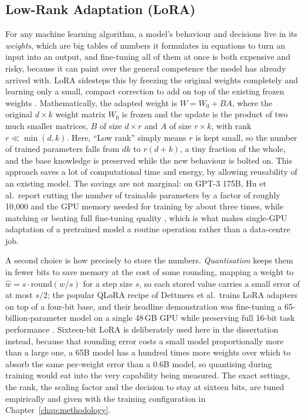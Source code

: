 \subsection{Low-Rank Adaptation (LoRA)}
\label{subsec:low-rank-adaptation-lora}

For any machine learning algorithm, a model's behaviour and decisions live in its \emph{weights}, which are big tables of numbers it formulates in equations to turn an input into an output, and fine-tuning all of them at once is both expensive and risky, because it can paint over the general competence the model has already arrived with. LoRA sidesteps this by freezing the original weights completely and learning only a small, compact correction to add on top of the existing frozen weights \cite{hu2021loralowrankadaptationlarge}. Mathematically, the adapted weight is $W = W_0 + BA$, where the original $d \times k$ weight matrix $W_0$ is frozen and the update is the product of two much smaller matrices, $B$ of size $d \times r$ and $A$ of size $r \times k$, with rank $r \ll \min(d,k)$. Here, ``Low rank'' simply means $r$ is kept small, so the number of trained parameters falls from $dk$ to $r(d+k)$, a tiny fraction of the whole, and the base knowledge is preserved while the new behaviour is bolted on. This approach saves a lot of computational time and energy, by allowing reusability of an existing model. The savings are not marginal: on GPT-3 175B, Hu et al.\ report cutting the number of trainable parameters by a factor of roughly 10,000 and the GPU memory needed for training by about three times, while matching or beating full fine-tuning quality \cite{hu2021loralowrankadaptationlarge}, which is what makes single-GPU adaptation of a pretrained model a routine operation rather than a data-centre job. 

A second choice is how precisely to store the numbers. \emph{Quantisation} keeps them in fewer bits to save memory at the cost of some rounding, mapping a weight to $\hat{w} = s \cdot \mathrm{round}(w / s)$ for a step size $s$, so each stored value carries a small error of at most $s/2$; the popular QLoRA recipe of Dettmers et al.\ trains LoRA adapters on top of a four-bit base, and their headline demonstration was fine-tuning a 65-billion-parameter model on a single 48\,GB GPU while preserving full 16-bit task performance \cite{dettmers2023qloraefficientfinetuningquantized}. Sixteen-bit LoRA is deliberately used here in the dissertation instead, because that rounding error costs a small model proportionally more than a large one, a 65B model has a hundred times more weights over which to absorb the same per-weight error than a 0.6B model, so quantising during training would eat into the very capability being measured. The exact settings, the rank, the scaling factor and the decision to stay at sixteen bits, are tuned empirically and given with the training configuration in Chapter~\ref{chap:methodology}.

